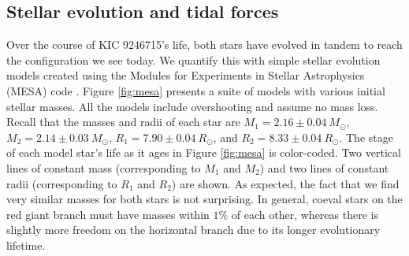 \subsection{Stellar evolution and tidal forces}\label{tides}

Over the course of KIC 9246715's life, both stars have evolved in tandem to reach the configuration we see today. We quantify this with simple stellar evolution models created using the Modules for Experiments in Stellar Astrophysics (MESA) code \citep{pax11,pax13,pax15}. Figure \ref{fig:mesa} presents a suite of models with various initial stellar masses. All the models include overshooting and assume no mass loss. Recall that the masses and radii of each star are $M_1 = 2.16 \pm 0.04\ M_{\odot}$, $M_2 = 2.14 \pm 0.03\ M_{\odot}$, $R_1 = 7.90 \pm 0.04 \ R_{\odot}$, and $R_2 = 8.33 \pm 0.04 \ R_{\odot}$. The stage of each model star's life as it ages in Figure \ref{fig:mesa} is color-coded. Two vertical lines of constant mass (corresponding to $M_1$ and $M_2$) and two lines of constant radii (corresponding to $R_1$ and $R_2$) are shown. As expected, the fact that we find very similar masses for both stars is not surprising. In general, coeval stars on the red giant branch must have masses within $1\%$ of each other, whereas there is slightly more freedom on the horizontal branch due to its longer evolutionary lifetime.

